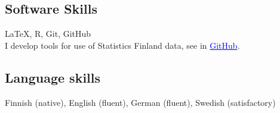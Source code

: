 \documentclass[16pt]{article}
\begin{document}
\subsection*{Software Skills}

\LaTeX, R, Git, GitHub \\

\noindent I develop tools for use of Statistics Finland data, see in \href{https://github.com/jalasalmi}{\textcolor{blue}{GitHub}}.

\subsection*{Language skills}
Finnish (native), English (fluent), German (fluent), Swedish (satisfactory)



%
%                                                 
%
%
%                           
%
\end{document}

